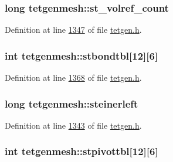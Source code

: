 \subsubsection[{\texorpdfstring{st\+\_\+volref\+\_\+count}{st_volref_count}}]{\setlength{\rightskip}{0pt plus 5cm}long tetgenmesh\+::st\+\_\+volref\+\_\+count}\hypertarget{classtetgenmesh_afa7b63c64990d773c22700fd9022bbdd}{}\label{classtetgenmesh_afa7b63c64990d773c22700fd9022bbdd}


Definition at line \hyperlink{tetgen_8h_source_l01347}{1347} of file \hyperlink{tetgen_8h_source}{tetgen.\+h}.

\subsubsection[{\texorpdfstring{stbondtbl}{stbondtbl}}]{\setlength{\rightskip}{0pt plus 5cm}int tetgenmesh\+::stbondtbl\mbox{[}12\mbox{]}\mbox{[}6\mbox{]}\hspace{0.3cm}{\ttfamily [static]}}\hypertarget{classtetgenmesh_a15c57f6771574f4c67bfb4c29e19a7e1}{}\label{classtetgenmesh_a15c57f6771574f4c67bfb4c29e19a7e1}


Definition at line \hyperlink{tetgen_8h_source_l01368}{1368} of file \hyperlink{tetgen_8h_source}{tetgen.\+h}.

\subsubsection[{\texorpdfstring{steinerleft}{steinerleft}}]{\setlength{\rightskip}{0pt plus 5cm}long tetgenmesh\+::steinerleft}\hypertarget{classtetgenmesh_a75d135951ad8b417cab56a9ae3be44c8}{}\label{classtetgenmesh_a75d135951ad8b417cab56a9ae3be44c8}


Definition at line \hyperlink{tetgen_8h_source_l01343}{1343} of file \hyperlink{tetgen_8h_source}{tetgen.\+h}.

\subsubsection[{\texorpdfstring{stpivottbl}{stpivottbl}}]{\setlength{\rightskip}{0pt plus 5cm}int tetgenmesh\+::stpivottbl\mbox{[}12\mbox{]}\mbox{[}6\mbox{]}\hspace{0.3cm}{\ttfamily [static]}}\hypertarget{classtetgenmesh_a1e8845b52a4cf0c53082dda5b3d85ab9}{}\label{classtetgenmesh_a1e8845b52a4cf0c53082dda5b3d85ab9}



